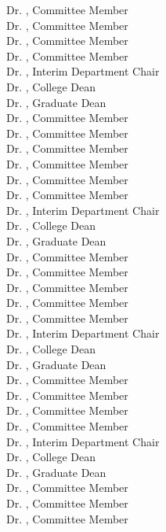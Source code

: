 \begin{titlepage}
Dr. \commemd, Committee Member\\
Dr. \commeme, Committee Member\\
Dr. \commemf, Committee Member\\
Dr. \commemg, Committee Member\\
Dr. \depchair, Interim Department Chair\\
Dr. \colldean, College Dean\\
Dr. \graddean, Graduate Dean\\
\else
\ifdefined\commemf
\noindent
Dr. \commema, Committee Member\\
Dr. \commemb, Committee Member\\
Dr. \commemc, Committee Member\\
Dr. \commemd, Committee Member\\
Dr. \commeme, Committee Member\\
Dr. \commemf, Committee Member\\
Dr. \depchair, Interim Department Chair\\
Dr. \colldean, College Dean\\
Dr. \graddean, Graduate Dean\\
\else
\ifdefined\commeme
Dr. \commema, Committee Member\\
Dr. \commemb, Committee Member\\
Dr. \commemc, Committee Member\\
Dr. \commemd, Committee Member\\
Dr. \commeme, Committee Member\\
Dr. \depchair, Interim Department Chair\\
Dr. \colldean, College Dean\\
Dr. \graddean, Graduate Dean\\
\else
\ifdefined\commemd
Dr. \commema, Committee Member\\
Dr. \commemb, Committee Member\\
Dr. \commemc, Committee Member\\
Dr. \commemd, Committee Member\\
Dr. \depchair, Interim Department Chair\\
Dr. \colldean, College Dean\\
Dr. \graddean, Graduate Dean\\
\else
\ifdefined\commemc
Dr. \commema, Committee Member\\
Dr. \commemb, Committee Member\\
Dr. \commemc, Committee Member\\

\end{titlepage}

